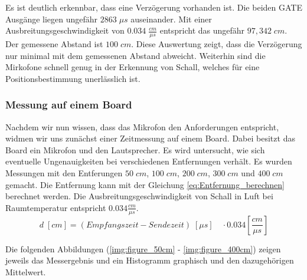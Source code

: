 Es ist deutlich erkennbar, dass eine Verzögerung vorhanden ist. Die beiden \si{GATE} Ausgänge liegen ungefähr $2863 \; \mu s$ auseinander. Mit einer Ausbreitungsgeschwindigkeit von $0.034 \; \frac{cm}{\mu s}$ entspricht das ungefähr $97,342 \; cm$. Der gemessene Abstand ist $100 \; cm$. Diese Auswertung zeigt, dass die Verzögerung nur minimal mit dem gemessenen Abstand abweicht. Weiterhin sind die Mirkofone schnell genug in der Erkennung von Schall, welches für eine Positionsbestimmung unerlässlich ist.

\subsubsection{Messung auf einem Board}

Nachdem wir nun wissen, dass das Mikrofon den Anforderungen entspricht, widmen wir uns zunächst einer Zeitmessung auf einem Board. Dabei besitzt das \board \platz Board ein Mikrofon und den Lautsprecher. Es wird untersucht, wie sich eventuelle Ungenauigkeiten bei verschiedenen Entfernungen verhält. Es wurden Messungen mit den Entferungen $50 \; cm$, $100 \; cm$, $200 \; cm$, $300 \; cm$ und $400 \; cm$ gemacht. Die Entfernung kann mit der Gleichung \ref{eq:Entfernung_berechnen} berechnet werden. Die Ausbreitungsgeschwindigkeit von Schall in Luft bei Raumtemperatur entspricht $0.034 \frac{cm}{\mu s}$.
\begin{equation}\label{eq:Entfernung_berechnen}
d \; [cm] = (Empfangszeit - Sendezeit)\;[\mu s]\quad\cdot 0.034 [\frac{cm}{\mu s}]
\end{equation}

Die folgenden Abbildungen (\ref{img:figure_50cm} - \ref{img:figure_400cm}) zeigen jeweils das Messergebnis und ein Histogramm graphisch und den dazugehörigen Mittelwert.

